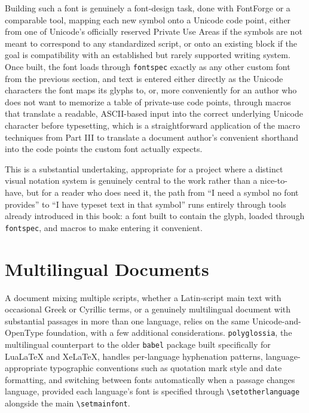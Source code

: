 Building such a font is genuinely a font-design task, done with FontForge or a comparable tool, mapping each new symbol onto a Unicode code point, either from one of Unicode's officially reserved Private Use Areas if the symbols are not meant to correspond to any standardized script, or onto an existing block if the goal is compatibility with an established but rarely supported writing system. Once built, the font loads through \texttt{fontspec} exactly as any other custom font from the previous section, and text is entered either directly as the Unicode characters the font maps its glyphs to, or, more conveniently for an author who does not want to memorize a table of private-use code points, through macros that translate a readable, ASCII-based input into the correct underlying Unicode character before typesetting, which is a straightforward application of the macro techniques from Part III to translate a document author's convenient shorthand into the code points the custom font actually expects.

This is a substantial undertaking, appropriate for a project where a distinct visual notation system is genuinely central to the work rather than a nice-to-have, but for a reader who does need it, the path from ``I need a symbol no font provides'' to ``I have typeset text in that symbol'' runs entirely through tools already introduced in this book: a font built to contain the glyph, loaded through \texttt{fontspec}, and macros to make entering it convenient.

\hypertarget{multilingual-documents}{%
\section{Multilingual Documents}\label{multilingual-documents}}

A document mixing multiple scripts, whether a Latin-script main text with occasional Greek or Cyrillic terms, or a genuinely multilingual document with substantial passages in more than one language, relies on the same Unicode-and-OpenType foundation, with a few additional considerations. \texttt{polyglossia}, the multilingual counterpart to the older \texttt{babel} package built specifically for LuaLaTeX and XeLaTeX, handles per-language hyphenation patterns, language-appropriate typographic conventions such as quotation mark style and date formatting, and switching between fonts automatically when a passage changes language, provided each language's font is specified through \texttt{\textbackslash{}setotherlanguage} alongside the main \texttt{\textbackslash{}setmainfont}.

